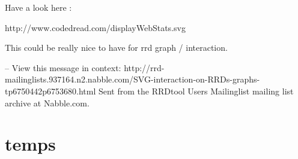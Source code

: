 




Have a look here : 

http://www.codedread.com/displayWebStats.svg

This could be really nice to have for rrd graph / interaction.

--
View this message in context: http://rrd-mailinglists.937164.n2.nabble.com/SVG-interaction-on-RRDs-graphs-tp6750442p6753680.html
Sent from the RRDtool Users Mailinglist mailing list archive at Nabble.com.




\section{temps}
















